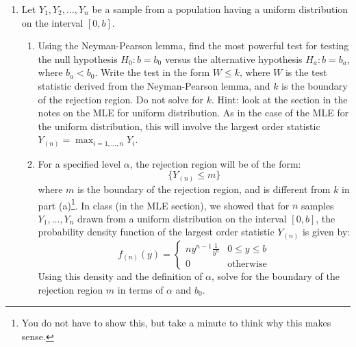 \documentclass[12pt]{article}
\begin{document}
\begin{enumerate}
\item Let $Y_1, Y_2, \dots, Y_n$ be a sample from a population having a uniform distribution on the interval $[0, b]$. 
\begin{enumerate}
\item Using the Neyman-Pearson lemma, find the most powerful test for testing the null hypothesis $H_0: b = b_0$ versus the alternative hypothesis $H_a: b = b_a$, where $b_a < b_0$. Write the test in the form $W \leq k$, where $W$ is the test statistic derived from the Neyman-Pearson lemma, and $k$ is the boundary of the rejection region. Do not solve for $k$. Hint: look at the section in the notes on the MLE for uniform distribution. As in the case of the MLE for the uniform distribution, this will involve the largest order statistic $Y_{(n)} = \max_{i = 1, \dots, n} Y_i$.
\item For a specified level $\alpha$, the rejection region will be of the form:
\[
\{ Y_{(n)} \leq m \}
\]
where $m$ is the boundary of the rejection region, and is different from $k$ in part (a)\footnote{You do not have to show this, but take a minute to think why this makes sense.}. In class (in the MLE section), we showed that for $n$ samples $Y_1, \dots, Y_n$ drawn from a uniform distribution on the interval $[0, b]$, the probability density function of the largest order statistic $Y_{(n)}$ is given by:
\[
f_{(n)}(y) = \begin{cases}
n y^{n-1} \frac{1}{b^n} & 0 \leq y \leq b \\
0 & \text{otherwise}
\end{cases}
\]
Using this density and the definition of $\alpha$, solve for the boundary of the rejection region $m$ in terms of $\alpha$ and $b_0$. 
\end{enumerate}

\end{enumerate}
\end{document}
